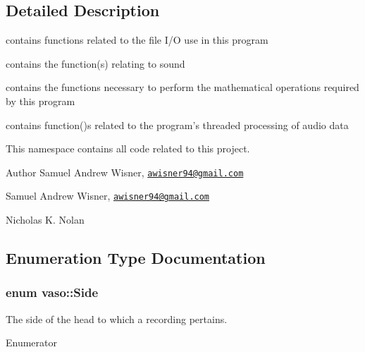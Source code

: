 \subsection{Detailed Description}
contains functions related to the file I/\+O use in this program 

contains the function(s) relating to sound

contains the functions necessary to perform the mathematical operations required by this program

contains function()s related to the program's threaded processing of audio data

This namespace contains all code related to this project.

\begin{DoxyAuthor}{Author}
Samuel Andrew Wisner, \href{mailto:awisner94@gmail.com}{\tt awisner94@gmail.\+com}

Samuel Andrew Wisner, \href{mailto:awisner94@gmail.com}{\tt awisner94@gmail.\+com} 

Nicholas K. Nolan 
\end{DoxyAuthor}


\subsection{Enumeration Type Documentation}
\hypertarget{namespacevaso_a77c5d9704657d49d456f691ddd8abf7c}{
\subsubsection[{Side}]{\setlength{\rightskip}{0pt plus 5cm}enum {\bf vaso\+::\+Side}\hspace{0.3cm}{\ttfamily [strong]}}}\label{namespacevaso_a77c5d9704657d49d456f691ddd8abf7c}
The side of the head to which a recording pertains. \begin{Desc}
\item[Enumerator]\par
\begin{description}
\item[{\em 
\hypertarget{namespacevaso_a77c5d9704657d49d456f691ddd8abf7ca945d5e233cf7d6240f6b783b36a374ff}{Left}\label{namespacevaso_a77c5d9704657d49d456f691ddd8abf7ca945d5e233cf7d6240f6b783b36a374ff}
}]\item[{\em 
\hypertarget{namespacevaso_a77c5d9704657d49d456f691ddd8abf7ca92b09c7c48c520c3c55e497875da437c}{Right}\label{namespacevaso_a77c5d9704657d49d456f691ddd8abf7ca92b09c7c48c520c3c55e497875da437c}
}]\end{description}
\end{Desc}


